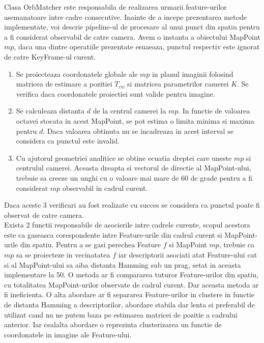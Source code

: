 \documentclass[12pt,a4paper]{report}
\begin{document}
Clasa OrbMatcher este responsabila de realizarea urmarii feature-urilor asemanatoare intre 
cadre consecutive. Inainte de a incepe prezentarea metode implementate, voi descrie
pipeline-ul de procesare al unui punct din spatiu pentru a fi considerat observabil de 
catre camera. Avem o instanta a obiectului MapPoint $ mp $, daca una dintre operatiile
prezentate esuaeaza, punctul respectiv este ignorat de catre KeyFrame-ul curent.
\begin{enumerate}
    \item Se proiecteaza coordonatele globale ale $ mp $ in planul imaginii folosind matricea 
de estimare a pozitiei $ T_{cw} $ si matricea parametrilor camerei $ K $. Se verifica daca 
coordonatele proiectiei sunt valide pentru imagine.     
    \item Se calculeaza distanta $ d $ de la centrul camerei la $ mp $. In functie de valoarea 
octavei stocata in acest MapPoint, se pot estima o limita minima si maxima pentru $ d $. 
Daca valoarea obtinuta nu se incadreaza in acest interval se considera ca punctul este invalid.
    \item Cu ajutorul geometriei analitice se obtine ecuatia dreptei care uneste $ mp $ 
si centrulul camerei. Aceasta dreapta si vectorul de directie al MapPoint-ului,
trebuie sa creeze un unghi cu o valoare mai mare de 60 de grade pentru a fi considerat $ mp $
observabil in cadrul curent.
\end{enumerate} 
Daca aceste 3 verificari au fost realizate cu succes se considera ca punctul poate fi observat
de catre camera. \\
Exista 2 functii responsabile de asocierile intre cadrele curente, scopul acestora 
este ca gaseasca corespondente intre Feature-urile din cadrul curent si MapPoint-urile 
din spatiu. Pentru a se gasi perechea Feature $ f $ si MapPoint $ mp $, trebuie ca
$ mp $ sa se proiecteze in vecinatatea $ f $ iar descriptorii asociati atat Feature-ului 
cat si al MapPoint-ului sa aiba distanta Hamming sub un prag, setat in aceasta implementare la 50.     
O metoda ar fi compararea tuturor Feature-urilor din spatiu, cu totalitatea MapPoint-urilor 
observate de cadrul curent. Dar aceasta metoda ar fi ineficienta. O alta abordare ar fi separarea
Feature-urilor in clustere in functie de distanta Hamming a descriptorilor, abordare stabila dar 
lenta si preferabil de utilizat cand nu ne putem baza pe estimarea matricei de pozitie a cadrului anterior. 
Iar cealalta abordare o reprezinta clusterizarea un functie de coordonatele in imagine 
ale Feature-ului. \\ 
\end{document}
